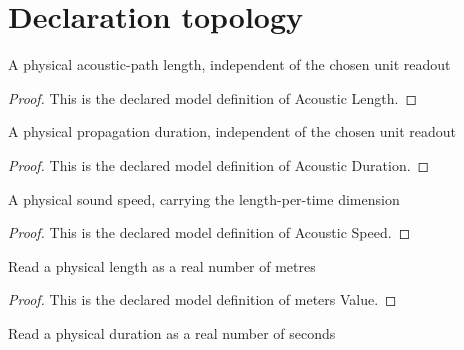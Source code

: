 \section{Declaration topology}
\begin{definition}
  \label{def:physics:phyx-mini-0168:phyxminiproblems-problemphyxmini0168-acousticlength}
  A physical acoustic-path length, independent of the chosen unit readout
\end{definition}
\begin{proof}
  This is the declared model definition of Acoustic Length.
\end{proof}
\begin{definition}
  \label{def:physics:phyx-mini-0168:phyxminiproblems-problemphyxmini0168-acousticduration}
  A physical propagation duration, independent of the chosen unit readout
\end{definition}
\begin{proof}
  This is the declared model definition of Acoustic Duration.
\end{proof}
\begin{definition}
  \label{def:physics:phyx-mini-0168:phyxminiproblems-problemphyxmini0168-acousticspeed}
  A physical sound speed, carrying the length-per-time dimension
\end{definition}
\begin{proof}
  This is the declared model definition of Acoustic Speed.
\end{proof}
\begin{definition}
  \label{def:physics:phyx-mini-0168:phyxminiproblems-problemphyxmini0168-metersvalue}
  Read a physical length as a real number of metres
\end{definition}
\begin{proof}
  This is the declared model definition of meters Value.
\end{proof}
\begin{definition}
  \label{def:physics:phyx-mini-0168:phyxminiproblems-problemphyxmini0168-secondsvalue}
  Read a physical duration as a real number of seconds
\end{definition}
